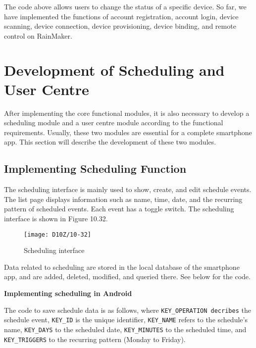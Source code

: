 \documentclass[a4paper,12pt]{book}
\begin{document}
The code above allows users to change the status of a specific device. So far, we have implemented the functions of account registration, account login, device scanning, device connection, device provisioning, device binding, and remote control on RainMaker.

\section{Development of Scheduling and User Centre}
After implementing the core functional modules, it is also necessary to develop a scheduling module and a user centre module according to the functional requirements. Usually, these two modules are essential for a complete smartphone app. This section will describe the development of these two modules.

\subsection{Implementing Scheduling Function}
The scheduling interface is mainly used to show, create, and edit schedule events. The list page displays information such as name, time, date, and the recurring pattern of scheduled events. Each event has a toggle switch. The scheduling interface is shown in Figure 10.32.

\begin{figure}[ht]
    \centering
    \texttt{[image: D10Z/10-32]}
    \caption{Scheduling interface}
\end{figure}

Data related to scheduling are stored in the local database of the smartphone app, and are added, deleted, modified, and queried there. See below for the code.

\textbf{Implementing scheduling in Android}


The code to save schedule data is as follows, where \verb|KEY_OPERATION decribes| the schedule event, \verb|KEY_ID| is the unique identifier, \verb|KEY_NAME| refers to the schedule’s name, \verb|KEY_DAYS| to the scheduled date, \verb|KEY_MINUTES| to the scheduled time, and \verb|KEY_TRIG|\newline \verb|GERS| to the recurring pattern (Monday to Friday).
\end{document}
